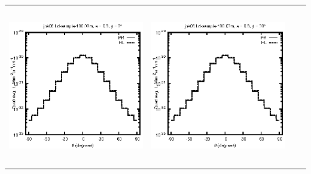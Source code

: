 \begin{tabular}{c c c c}
\includegraphics[height=7cm]{../eps/jok06_Ld_sample_100.00m_fwd.eps} &
\includegraphics[height=7cm]{../eps/jok06_Ld_sample_100.00m_cross.eps} \\
\end{tabular}

\pagebreak

